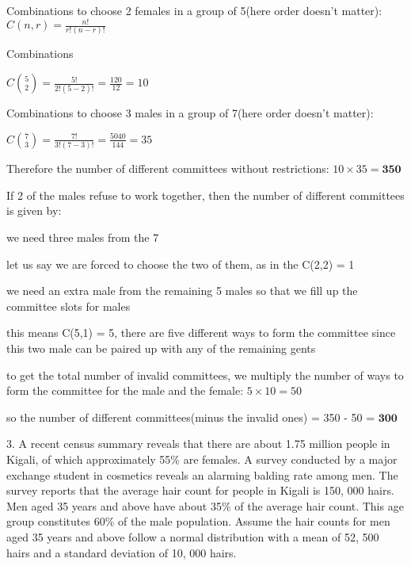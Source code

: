 \documentclass{article}
\begin{document}
Combinations to choose 2 females in a group of 5(here order doesn't matter): \(C(n,r) = \frac{n!}{r!(n-r)!}\)\newline

Combinations\newline

\(C\binom{5}{2} = \frac{5!}{2!(5-2)!} = \frac{120}{12} = 10\)\newline

Combinations to choose 3 males in a group of 7(here order doesn't matter):\newline

\(C\binom{7}{3} = \frac{7!}{3!(7-3)!} = \frac{5040}{144} = 35\)\newline

Therefore the number of different committees without restrictions: \(10 \times 35 = \textbf{350}\)\newline

If 2 of the males refuse to work together, then the number of different committees is given by:

we need three males from the 7\newline

let us say we are forced to choose the two of them, as in the C(2,2) = 1\newline

we need an extra male from the remaining 5 males so that we fill up the committee slots for males\newline

this means C(5,1) = 5, there are five different ways to form the committee since this two male can be paired up with any of the remaining gents\newline

to get the total number of invalid committees, we multiply the number of ways to form the committee for the male and the female: \(5 \times 10 = 50\)\newline

so the number of different committees(minus the invalid ones) = 350 - 50 = \(\mathbf{300}\)\newline



3. A recent census summary reveals that there are about 1.75 million people in Kigali, of which approximately 55\% are females. A survey conducted by a major exchange student in cosmetics reveals an alarming balding rate among men. The survey reports that the average hair count for people in Kigali is 150, 000 hairs. Men aged 35 years and above have about 35\% of the average
hair count. This age group constitutes 60\% of the male population. Assume the hair counts for men aged 35 years and above follow a normal distribution with a mean of 52, 500 hairs and a standard deviation of 10, 000 hairs.
\end{document}
